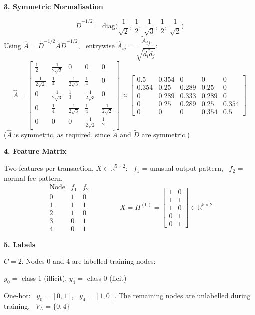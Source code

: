 \documentclass[12pt,a4paper]{article}
\newcommand{\Ahat}{\hat A}
\newcommand{\R}{\mathbb{R}}
\newcommand{\h}[1]{\par\medskip\textbf{\large #1}\par}
\begin{document}
\h{3. Symmetric Normalisation}
\[
  \tilde D^{-1/2} = \mathrm{diag}\Big(\frac{1}{\sqrt2},\ \frac12,\ \frac{1}{\sqrt3},\ \frac12,\ \frac{1}{\sqrt2}\Big)
\]
Using $\Ahat = \tilde D^{-1/2}\tilde A\tilde D^{-1/2}$, \ entrywise $\Ahat_{ij} = \dfrac{\tilde A_{ij}}{\sqrt{\tilde d_i \tilde d_j}}$:
\[
  \Ahat = \begin{bmatrix}
  \frac12 & \frac{1}{2\sqrt2} & 0 & 0 & 0\\[3pt]
  \frac{1}{2\sqrt2} & \frac14 & \frac{1}{2\sqrt3} & \frac14 & 0\\[3pt]
  0 & \frac{1}{2\sqrt3} & \frac13 & \frac{1}{2\sqrt3} & 0\\[3pt]
  0 & \frac14 & \frac{1}{2\sqrt3} & \frac14 & \frac{1}{2\sqrt2}\\[3pt]
  0&0&0&\frac{1}{2\sqrt2} & \frac12
  \end{bmatrix}
  \approx
  \begin{bmatrix}
  0.5 & 0.354 & 0 & 0 & 0\\
  0.354 & 0.25 & 0.289 & 0.25 & 0\\
  0 & 0.289 & 0.333 & 0.289 & 0\\
  0 & 0.25 & 0.289 & 0.25 & 0.354\\
  0 & 0 & 0 & 0.354 & 0.5
  \end{bmatrix}
\]
($\Ahat$ is symmetric, as required, since $\tilde A$ and $\tilde D$ are symmetric.)

\h{4. Feature Matrix}
Two features per transaction, $X \in \R^{5\times2}$: \
$f_1$ = unusual output pattern, \ $f_2$ = normal fee pattern.
\[
  \begin{array}{c|cc}
  \text{Node} & f_1 & f_2\\ \hline
  0 & 1 & 0\\ 1 & 1 & 1\\ 2 & 1 & 0\\ 3 & 0 & 1\\ 4 & 0 & 1
  \end{array}
  \qquad\qquad
  X = H^{(0)} = \begin{bmatrix} 1&0\\ 1&1\\ 1&0\\ 0&1\\ 0&1 \end{bmatrix} \in \R^{5\times2}
\]

\h{5. Labels}
$C = 2$. Nodes 0 and 4 are labelled training nodes:

$y_0 = $ class 1 (illicit), \quad $y_4 = $ class 0 (licit)

One-hot: \ $y_0 = [0, 1]$, \ $y_4 = [1, 0]$. The remaining nodes are unlabelled during training. \ $V_L = \{0, 4\}$
\end{document}
